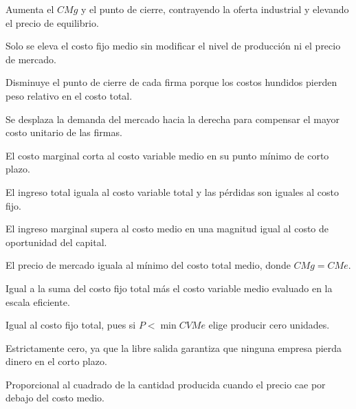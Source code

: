 \begin{opts}
    \item Aumenta el $CMg$ y el punto de cierre, contrayendo la oferta industrial y elevando el precio de equilibrio.
    \item Solo se eleva el costo fijo medio sin modificar el nivel de producción ni el precio de mercado.
    \item Disminuye el punto de cierre de cada firma porque los costos hundidos pierden peso relativo en el costo total.
    \item Se desplaza la demanda del mercado hacia la derecha para compensar el mayor costo unitario de las firmas.
\end{opts}

\begin{opts}
    \item El costo marginal corta al costo variable medio en su punto mínimo de corto plazo.
    \item El ingreso total iguala al costo variable total y las pérdidas son iguales al costo fijo.
    \item El ingreso marginal supera al costo medio en una magnitud igual al costo de oportunidad del capital.
    \item El precio de mercado iguala al mínimo del costo total medio, donde $CMg = CMe$.
\end{opts}

\begin{opts}
    \item Igual a la suma del costo fijo total más el costo variable medio evaluado en la escala eficiente.
    \item Igual al costo fijo total, pues si $P < \min CVMe$ elige producir cero unidades.
    \item Estrictamente cero, ya que la libre salida garantiza que ninguna empresa pierda dinero en el corto plazo.
    \item Proporcional al cuadrado de la cantidad producida cuando el precio cae por debajo del costo medio.
\end{opts}

